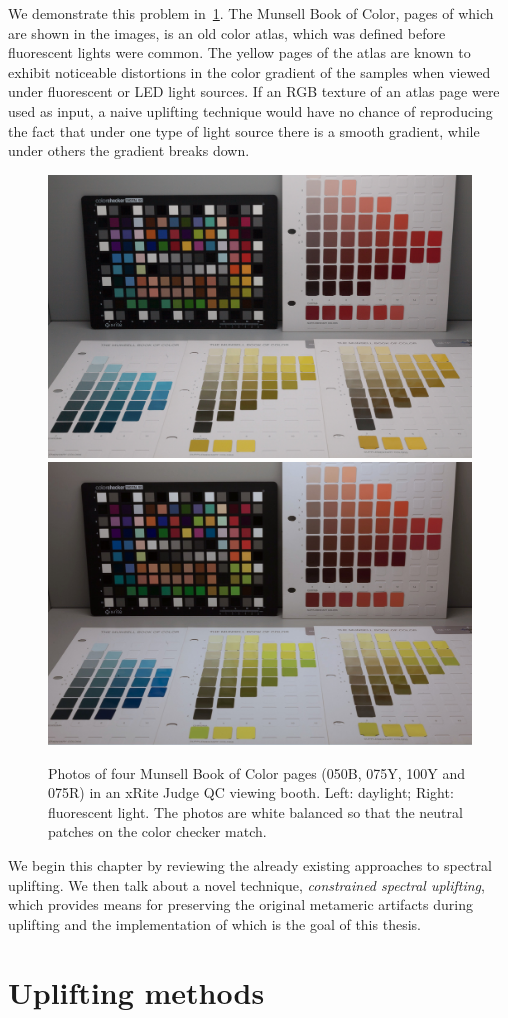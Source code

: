 We demonstrate this problem in~\cref{fig:spectral_uplifting_photos}. The Munsell Book of Color, pages of which are shown in the images, is an old color atlas, which was defined before fluorescent lights were common. The yellow pages of the atlas are known to exhibit noticeable distortions in the color gradient of the samples when viewed under fluorescent or LED light sources. If an RGB texture of an atlas page were used as input, a naive uplifting technique would have no chance of reproducing the fact that under one type of light source there is a smooth gradient, while under others the gradient breaks down. 

\begin{figure}[t]
	\centering
	\includegraphics[width=0.45\linewidth]{img/rendering_realbox_d65.jpg} 
	\quad
	\includegraphics[width=0.45\linewidth]{img/rendering_realbox_fluo.jpg}
	\caption{Photos of four Munsell Book of Color pages (050B, 075Y, 100Y and 075R) in an xRite Judge QC viewing booth. Left: daylight; Right: fluorescent light. The photos are white balanced so that the neutral patches on the color checker match.}
	\label{fig:spectral_uplifting_photos}
\end{figure}

We begin this chapter by reviewing the already existing approaches to spectral uplifting. We then talk about a novel technique, \emph{constrained spectral uplifting}, which provides means for preserving the original metameric artifacts during uplifting and the implementation of which is the goal of this thesis.

\section{Uplifting methods} \label{sec:upliftingMethods}

